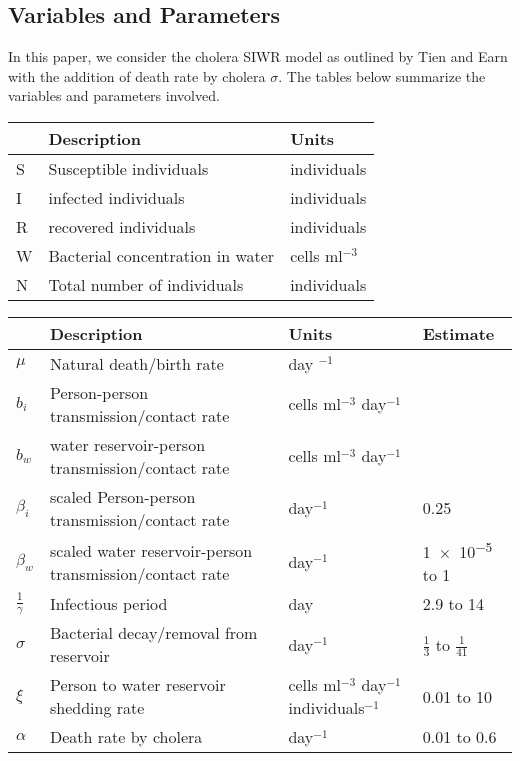 \documentclass[12pt]{article}\usepackage[]{graphicx}\usepackage[]{color}
\begin{document}
\subsection{Variables and Parameters}
In this paper, we consider the cholera SIWR model as outlined by Tien and Earn \cite{link9} with the addition of death rate by cholera $\sigma$.  The tables below summarize the variables and parameters involved.
\begin{center}
	\begin{tabular}{ | m{1em} | m{8.14cm}| m{5.5cm} | }
		\hline
		\textbf{ }& \textbf{Description} & \textbf{Units} \\
		\hline
		S & Susceptible individuals & individuals \\
		\hline
		I & infected individuals & individuals \\
		\hline
		R & recovered individuals & individuals \\
		\hline
		W & Bacterial concentration in water & cells ml$^{-3}$ \\
		\hline
		N & Total number of individuals & individuals\\
		\hline
	\end{tabular}
\end{center}
\begin{center}
	\begin{tabular}{ | m{1em} | m{8cm}| m{3cm} | m{2.2cm} | }
		\hline
		\textbf{ }& \textbf{Description} & \textbf{Units} &  \textbf{Estimate} \\
		\hline
		$\mu$ & Natural death/birth rate & day $^{-1}$ & \\
		\hline
		$b_i$ &  Person-person transmission/contact rate & cells ml$^{-3}$ day$^{-1}$ & \\
		\hline
		$b_w$ & water reservoir-person transmission/contact rate & cells ml$^{-3}$ day$^{-1}$&  \\
		\hline
		$\beta_i$ & scaled Person-person transmission/contact rate & day$^{-1}$ & 0.25\\
		\hline
		$\beta_w$ & scaled water reservoir-person transmission/contact rate & day$^{-1}$& \num{1e-5} to 1 \\
		\hline
		$\frac{1}{\gamma}$ & Infectious period & day& 2.9 to 14\\
		\hline
		$\sigma$ & Bacterial decay/removal from reservoir & day$^{-1}$& $\frac{1}{3}$ to $\frac{1}{41}$ \\
		\hline
		$\xi$ & Person to water reservoir shedding rate  & cells ml$^{-3}$ day$^{-1}$ individuals$^{-1}$ & 0.01 to 10\\
		\hline
		$\alpha$ & Death rate by cholera & day$^{-1}$& 0.01 to 0.6 \\
		\hline
	\end{tabular}
\end{center}
\end{document}
